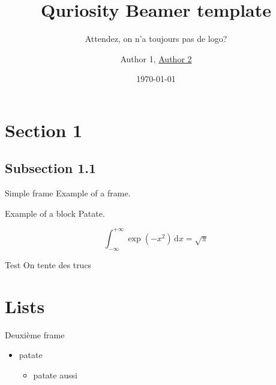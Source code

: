 \documentclass{beamer}
\title{Quriosity Beamer template}
\subtitle{Attendez, on n'a toujours pas de logo?}
\author{Author 1, \underline{Author 2}}
\institute{Télécom Paris, QURIOSITY Team}
\date{\today}
\begin{document}
    \begin{frame}
        \maketitle
    \end{frame}
    \section{Section 1}
    \subsection{Subsection 1.1}
    \begin{frame}{Simple frame}
        Example of a frame.
	    \begin{block}{Example of a block}
		    Patate.
	    \end{block}
        \begin{equation}
            \int_{-\infty}^{+\infty}\exp\left(-x^2\right)\,\mathrm{d}x=\sqrt{\pi}
        \end{equation}
        \begin{alertblock}{Test}
            On tente des trucs
        \end{alertblock}
    \end{frame}
    \section{Lists}
    \begin{frame}{Deuxième frame}
        \begin{itemize}
            \item patate
                \begin{itemize}
                    \item patate aussi
                \end{itemize}
        \end{itemize}
    \end{frame}
\end{document}
